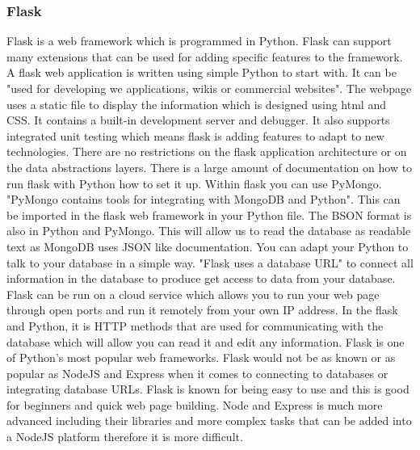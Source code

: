 \subsubsection{Flask}
Flask is a web framework which is programmed in Python. Flask can support many extensions that can be used for adding specific features to the framework. A flask web application is written using simple Python to start with. It can be "used for developing we applications, wikis or commercial websites".\cite{FlaskInfo} The webpage uses a static file to display the information which is designed using html and CSS. It contains a built-in development server and debugger. It also supports integrated unit testing which means flask is adding features to adapt to new technologies. There are no restrictions on the flask application architecture or on the data abstractions layers. There is a large amount of documentation on how to run flask with Python how to set it up. Within flask you can use PyMongo. "PyMongo contains tools for integrating with MongoDB and Python".\cite{PyMongo} This can be imported in the flask web framework in your Python file. The BSON format is also in Python and PyMongo. This will allow us to read the database as readable text as MongoDB uses JSON like documentation.\cite{PyMongo} You can adapt your Python to talk to your database in a simple way. "Flask uses a database URL" to connect all information in the database to produce get access to data from your database.\cite{FlaskPy} Flask can be run on a cloud service which allows you to run your web page through open ports and run it remotely from your own IP address. In the flask and Python, it is HTTP methods that are used for communicating with the database which will allow you can read it and edit any information. \cite{FlaskPy} Flask is one of Python's most popular web frameworks. Flask would not be as known or as popular as NodeJS and Express when it comes to connecting to databases or integrating database URLs. Flask is known for being easy to use and this is good for beginners and quick web page building. \cite{Flask} Node and Express is much more advanced including their libraries and more complex tasks that can be added into a NodeJS platform therefore it is more difficult.\cite{FlaskVNode}
